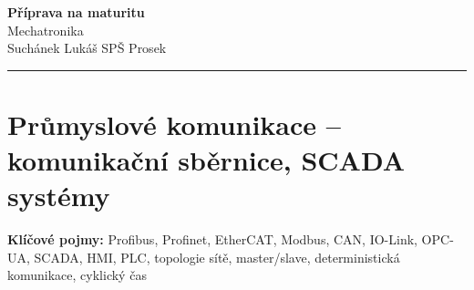 \documentclass[a4paper,10pt]{article}
\begin{document}
\begin{minipage}[t]{0.75\textwidth}
    {\Huge\bfseries\color{accent} Příprava na maturitu}\\[4pt]
    {\large\color{stripeblue} Mechatronika}\\[2pt]
    \textcolor{medgray}{\small Suchánek Lukáš \quad SPŠ Prosek }
\end{minipage}
\hfill
\begin{minipage}[t]{0.22\textwidth}
    \raggedleft
\end{minipage}

\vspace{6pt}
\noindent\color{accent}\rule{\linewidth}{1.5pt}
\vspace{2pt}

\section{Průmyslové komunikace -- komunikační sběrnice, SCADA systémy}

\begin{pojmybox}
\textbf{Klíčové pojmy:}
Profibus, Profinet, EtherCAT, Modbus, CAN, IO-Link,
OPC-UA, SCADA, HMI, PLC, topologie sítě,
master/slave, deterministická komunikace, cyklický čas
\end{pojmybox}
\end{document}
